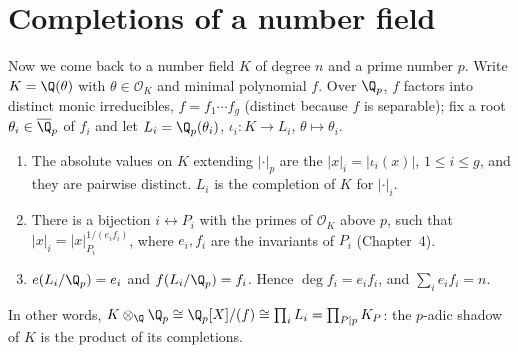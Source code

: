 \section{Completions of a number field}

Now we come back to a number field $K$ of degree $n$ and a prime number $p$. Write $K=\Q(\theta)$ with $\theta\in\mathcal O_K$
and minimal polynomial $f$. Over $\Q_p$, $f$ factors into distinct monic irreducibles, $f=f_1\cdots f_g$ (distinct because $f$ is
separable); fix a root $\theta_i\in\overline{\Q}_p$ of $f_i$ and let $L_i=\Q_p(\theta_i)$, $\iota_i:K\to L_i$, $\theta\mapsto\theta_i$.

\begin{theorem}\label{thm:completions}
\begin{enumerate}[label=(\alph*)]
\item The absolute values on $K$ extending $|\cdot|_p$ are the $|x|_i=|\iota_i(x)|$, $1\le i\le g$, and they are pairwise
distinct. $L_i$ is the completion of $K$ for $|\cdot|_i$.
\item There is a bijection $i\leftrightarrow P_i$ with the primes of $\mathcal O_K$ above $p$, such that $|x|_i=
|x|_{P_i}^{1/(e_if_i)}$, where $e_i,f_i$ are the invariants of $P_i$ (Chapter~4).
\item $e(L_i/\Q_p)=e_i$ and $f(L_i/\Q_p)=f_i$. Hence $\deg f_i=e_if_i$, and $\sum_ie_if_i=n$.
\end{enumerate}
In other words, $K\otimes_\Q\Q_p\cong\Q_p[X]/(f)\cong\prod_i L_i=\prod_{P\mid p}K_P$: the $p$-adic shadow of $K$ is the product of
its completions.
\end{theorem}
